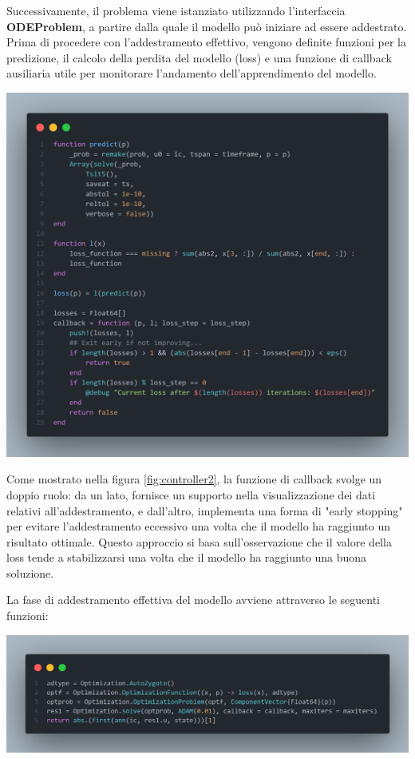 Successivamente, il problema viene istanziato utilizzando 
l'interfaccia \textbf{ODEProblem}, a partire dalla quale il modello 
può iniziare ad essere addestrato. Prima di procedere con 
l'addestramento effettivo, vengono definite funzioni per la predizione, 
il calcolo della perdita del modello (loss) e una funzione di callback 
ausiliaria utile per monitorare l'andamento dell'apprendimento del modello.

\begin{minipage}{\linewidth}
	\centering
	\includegraphics[width=\textwidth]{img/controller2.png}
	\label{fig:controller2}
\end{minipage}

Come mostrato nella figura \ref{fig:controller2}, la funzione di 
callback svolge un doppio ruolo: da un lato, fornisce un supporto 
nella visualizzazione dei dati relativi all'addestramento, e dall'altro, 
implementa una forma di "early stopping" per evitare l'addestramento 
eccessivo una volta che il modello ha raggiunto un risultato ottimale. 
Questo approccio si basa sull'osservazione che il valore della loss 
tende a stabilizzarsi una volta che il modello ha raggiunto una buona 
soluzione.

La fase di addestramento effettiva del modello avviene attraverso le 
seguenti funzioni:

\begin{minipage}{\linewidth}
	\centering
	\includegraphics[width=\textwidth]{img/controller3.png}
	\label{fig:controller3}
\end{minipage}

